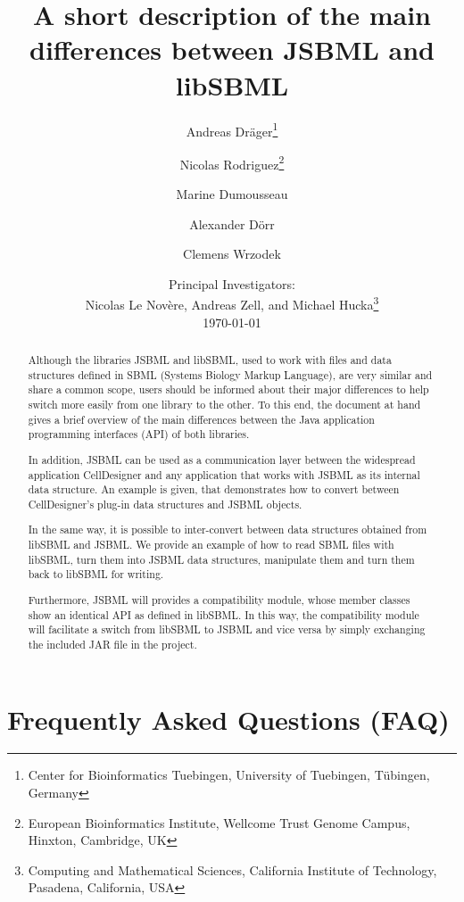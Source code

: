 \documentclass[
  BCOR12mm,
  letterpaper,
  11pt,
  headsepline,
  pointlessnumbers,
  tablecaptionabove,
  onelinecaption,
  headinclude,
  appendixprefix,
  twoside,
  titlepage
]{scrartcl}
\title{A short description of the main differences between JSBML and libSBML}
\author{Andreas Dr\"ager\thanks{Center for Bioinformatics Tuebingen, University
of Tuebingen, T\"ubingen, Germany}\and%
Nicolas Rodriguez\thanks{European Bioinformatics Institute, Wellcome Trust
Genome Campus, Hinxton, Cambridge, UK}\and%
Marine Dumousseau\footnotemark[2]\and%
Alexander D\"orr\footnotemark[1]\and%
Clemens Wrzodek\footnotemark[1]}
\date{Principal Investigators:\\
Nicolas Le Nov{\`e}re\footnotemark[2], Andreas Zell\footnotemark[1], and Michael
Hucka\thanks{Computing and Mathematical Sciences, California Institute of
Technology, Pasadena, California, USA}\\[4ex]
\today}
\begin{document}
\maketitle

\begin{abstract}
Although the libraries JSBML and libSBML, used to work with files and data
structures defined in SBML (Systems Biology Markup Language), are
very similar and share a common scope, users should be informed about their
major differences to help switch more easily from one library to the other. To
this end, the document at hand gives a brief overview of the main differences
between the Java\texttrademark{} application programming interfaces (API) of
both libraries.

In addition, JSBML can be used as a communication layer between the widespread
application CellDesigner and any application that works with JSBML as its
internal data structure. An example is given, that demonstrates how to
convert between CellDesigner's plug-in data structures and JSBML objects.

In the same way, it is possible to inter-convert between data structures
obtained from libSBML and JSBML. We provide an example of how to read SBML files
with libSBML, turn them into JSBML data structures, manipulate them and turn
them back to libSBML for writing.

Furthermore, JSBML will provides a compatibility module, whose member classes
show an identical API as defined in libSBML. In this way, the
compatibility module will facilitate a switch from libSBML to JSBML and vice
versa by simply exchanging the included JAR file in the project.


\end{abstract}

\tableofcontents


\appendix

\section{Frequently Asked Questions (FAQ)}





\printindex
\end{document}
